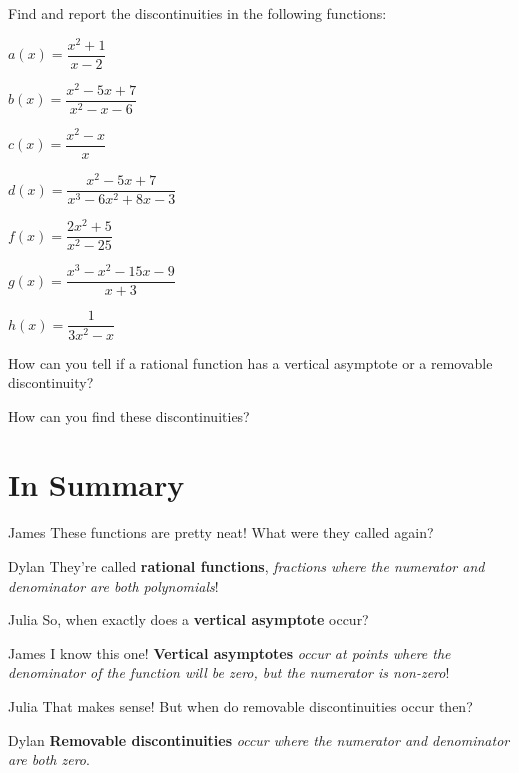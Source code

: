 \documentclass{ximera}
\begin{document}
Find and report the discontinuities in the following functions:

$a(x) = \dfrac{x^2+1}{x-2}$

$b(x) = \dfrac{x^2-5x+7}{x^2-x-6}$

$c(x) = \dfrac{x^2-x}{x}$

$d(x) = \dfrac{x^2-5x+7}{x^3-6x^2+8x-3}$

$f(x) = \dfrac{2x^2+5}{x^2-25}$

$g(x) = \dfrac{x^3-x^2-15x-9}{x+3}$

$h(x) = \dfrac{1}{3x^2-x}$

\begin{question}
How can you tell if a rational function has a vertical asymptote or a removable discontinuity?
\begin{freeResponse}
\end{freeResponse}
How can you find these discontinuities?
\begin{freeResponse}
\end{freeResponse}
\end{question}

\section{In Summary}
\begin{dialogue}
\item[James] These functions are pretty neat! What were they called again?
\item[Dylan] They're called \textbf{rational functions}, \textit{fractions where the numerator and denominator are both polynomials}!
\item[Julia] So, when exactly does a \textbf{vertical asymptote} occur?
\item[James] I know this one! \textbf{Vertical asymptotes} \textit{occur at points where the denominator of the function will be zero, but the numerator is non-zero}!
\item[Julia] That makes sense! But when do removable discontinuities occur then?
\item[Dylan] \textbf{Removable discontinuities} \textit{occur where the numerator and denominator are both zero}.
\end{dialogue}
\end{document}
